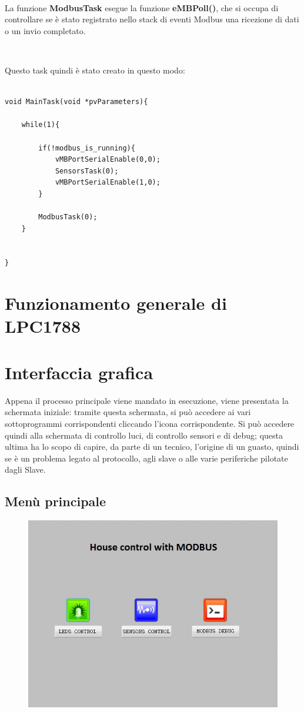 \documentclass[a4paper,titlepage]{book}
\begin{document}
~

La funzione \textbf{ModbusTask} esegue la funzione \textbf{eMBPoll()}, che si occupa di controllare se è stato registrato nello stack di eventi Modbus una ricezione di dati o un invio completato.

~

Questo task quindi è stato creato in questo modo:

\begin{lstlisting}

void MainTask(void *pvParameters){

	while(1){

		if(!modbus_is_running){
			vMBPortSerialEnable(0,0);
			SensorsTask(0);
			vMBPortSerialEnable(1,0);
		}

		ModbusTask(0);
	}
		

}

\end{lstlisting}


\section{Funzionamento generale di LPC1788}

\section{Interfaccia grafica}

Appena il processo principale viene mandato in esecuzione, viene presentata la schermata iniziale: tramite questa schermata, si può accedere ai vari sottoprogrammi corrispondenti cliccando l'icona corrispondente. Si può accedere quindi alla schermata di controllo luci, di controllo sensori e di debug; questa ultima ha lo scopo di capire, da parte di un tecnico, l'origine di un guasto, quindi se è un problema legato al protocollo, agli slave o alle varie periferiche pilotate dagli Slave. 

\subsection{Menù principale}

\begin{figure}[!h]
\centering
\includegraphics[scale=0.6]{menu.jpg}
\end{figure}
\end{document}
